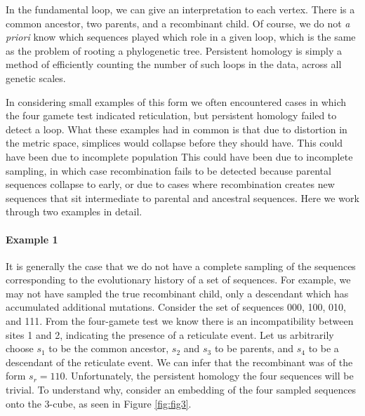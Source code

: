 In the fundamental loop, we can give an interpretation to each vertex.
There is a common ancestor, two parents, and a recombinant child.
Of course, we do not \emph{a priori} know which sequences played which role in a given loop, which is the same as the problem of rooting a phylogenetic tree.
Persistent homology is simply a method of efficiently counting the number of such loops in the data, across all genetic scales.

In considering small examples of this form we often encountered cases in which the four gamete test indicated reticulation, but persistent homology failed to detect a loop.
What these examples had in common is that due to distortion in the metric space, simplices would collapse before they should have.
This could have been due to incomplete population
This could have been due to incomplete sampling, in which case recombination fails to be detected because parental sequences collapse to early, or due to cases where recombination creates new sequences that sit intermediate to parental and ancestral sequences.
Here we work through two examples in detail.

\paragraph{Example 1}
\label{ex:example1}
%
It is generally the case that we do not have a complete sampling of the sequences corresponding to the evolutionary history of a set of sequences.
For example, we may not have sampled the true recombinant child, only a descendant which has accumulated additional mutations.
Consider the set of sequences 000, 100, 010, and 111.
From the four-gamete test we know there is an incompatibility between sites 1 and 2, indicating the presence of a reticulate event.
Let us arbitrarily choose $s_1$ to be the common ancestor, $s_2$ and $s_3$ to be parents, and $s_4$ to be a descendant of the reticulate event.
We can infer that the recombinant was of the form $s_r=110$.
Unfortunately, the persistent homology the four sequences will be trivial.
To understand why, consider an embedding of the four sampled sequences onto the 3-cube, as seen in Figure \ref{fig:fig3}.

